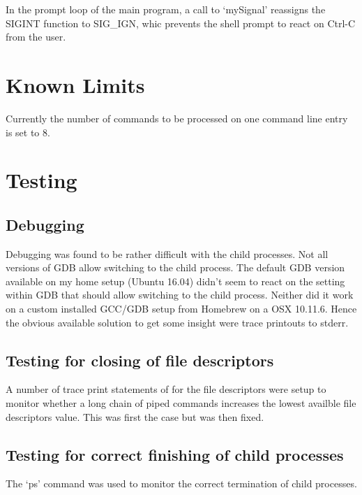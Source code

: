 \documentclass[a4paper,11pt,twoside]{article}
\begin{document}
In the prompt loop of the main program, a call to `mySignal' reassigns the SIGINT function to SIG\_IGN, whic prevents the shell prompt to react on Ctrl-C from the user.  


\section{Known Limits}
Currently the number of commands to be processed on one command line entry is set to 8. 

\section{Testing}

\subsection{Debugging}
Debugging was found to be rather difficult with the child processes. Not all versions of GDB allow switching to the child process. The default GDB version available on my home setup (Ubuntu 16.04) didn't seem to react on the setting within GDB that should allow switching to the child process. Neither did it work on a custom installed GCC/GDB setup from Homebrew on a OSX 10.11.6. Hence the obvious available solution to get some insight were trace printouts to stderr. 

\subsection{Testing for closing of file descriptors}
A number of trace print statements of for the file descriptors were setup to monitor whether a long chain of piped commands increases the lowest availble file descriptors value. This was first the case but was then fixed.

\subsection{Testing for correct finishing of child processes}
The `ps' command was used to monitor the correct termination of child processes. 

%
\end{document}
